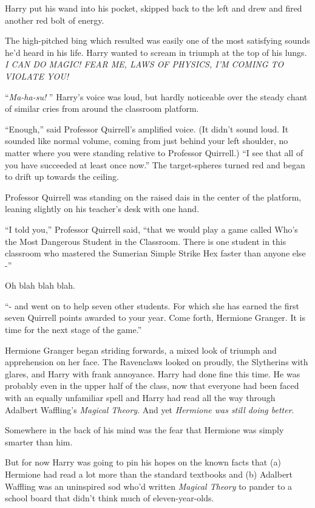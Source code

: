 Harry put his wand into his pocket, skipped back to the left and drew
and fired another red bolt of energy.

The high-pitched bing which resulted was easily one of the most
satisfying sounds he'd heard in his life. Harry wanted to scream in
triumph at the top of his lungs. \emph{I CAN DO MAGIC! FEAR ME, LAWS OF
PHYSICS, I'M COMING TO VIOLATE YOU!}

``\emph{Ma-ha-su!} '' Harry's voice was loud, but hardly noticeable over
the steady chant of similar cries from around the classroom platform.

``Enough,'' said Professor Quirrell's amplified voice. (It didn't sound
loud. It sounded like normal volume, coming from just behind your left
shoulder, no matter where you were standing relative to Professor
Quirrell.) ``I see that all of you have succeeded at least once now.''
The target-spheres turned red and began to drift up towards the ceiling.

Professor Quirrell was standing on the raised dais in the center of the
platform, leaning slightly on his teacher's desk with one hand.

``I told you,'' Professor Quirrell said, ``that we would play a game
called Who's the Most Dangerous Student in the Classroom. There is one
student in this classroom who mastered the Sumerian Simple Strike Hex
faster than anyone else -''

Oh blah blah blah.

``- and went on to help seven other students. For which she has earned
the first seven Quirrell points awarded to your year. Come forth,
Hermione Granger. It is time for the next stage of the game.''

Hermione Granger began striding forwards, a mixed look of triumph and
apprehension on her face. The Ravenclaws looked on proudly, the
Slytherins with glares, and Harry with frank annoyance. Harry had done
fine this time. He was probably even in the upper half of the class, now
that everyone had been faced with an equally unfamiliar spell and Harry
had read all the way through Adalbert Waffling's \emph{Magical Theory}.
And yet \emph{Hermione was still doing better}.

Somewhere in the back of his mind was the fear that Hermione was simply
smarter than him.

But for now Harry was going to pin his hopes on the known facts that (a)
Hermione had read a lot more than the standard textbooks and (b)
Adalbert Waffling was an uninspired sod who'd written \emph{Magical
Theory} to pander to a school board that didn't think much of
eleven-year-olds.

